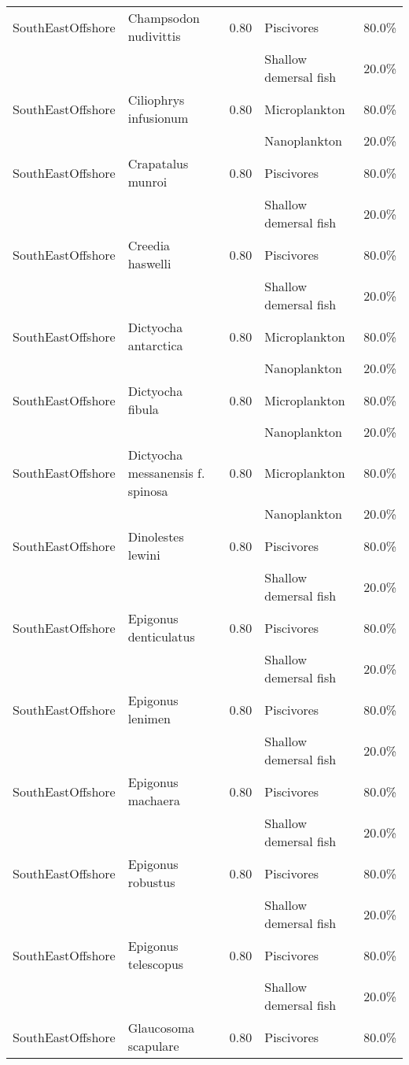 \begin{longtable}{llcll}
\hline
SouthEastOffshore & Champsodon nudivittis & 0.80 & Piscivores & 80.0\% \\
& & & Shallow demersal fish & 20.0\% \\
\hline
SouthEastOffshore & Ciliophrys infusionum & 0.80 & Microplankton & 80.0\% \\
& & & Nanoplankton & 20.0\% \\
\hline
SouthEastOffshore & Crapatalus munroi & 0.80 & Piscivores & 80.0\% \\
& & & Shallow demersal fish & 20.0\% \\
\hline
SouthEastOffshore & Creedia haswelli & 0.80 & Piscivores & 80.0\% \\
& & & Shallow demersal fish & 20.0\% \\
\hline
SouthEastOffshore & Dictyocha antarctica & 0.80 & Microplankton & 80.0\% \\
& & & Nanoplankton & 20.0\% \\
\hline
SouthEastOffshore & Dictyocha fibula & 0.80 & Microplankton & 80.0\% \\
& & & Nanoplankton & 20.0\% \\
\hline
SouthEastOffshore & Dictyocha messanensis f. spinosa & 0.80 & Microplankton & 80.0\% \\
& & & Nanoplankton & 20.0\% \\
\hline
SouthEastOffshore & Dinolestes lewini & 0.80 & Piscivores & 80.0\% \\
& & & Shallow demersal fish & 20.0\% \\
\hline
SouthEastOffshore & Epigonus denticulatus & 0.80 & Piscivores & 80.0\% \\
& & & Shallow demersal fish & 20.0\% \\
\hline
SouthEastOffshore & Epigonus lenimen & 0.80 & Piscivores & 80.0\% \\
& & & Shallow demersal fish & 20.0\% \\
\hline
SouthEastOffshore & Epigonus machaera & 0.80 & Piscivores & 80.0\% \\
& & & Shallow demersal fish & 20.0\% \\
\hline
SouthEastOffshore & Epigonus robustus & 0.80 & Piscivores & 80.0\% \\
& & & Shallow demersal fish & 20.0\% \\
\hline
SouthEastOffshore & Epigonus telescopus & 0.80 & Piscivores & 80.0\% \\
& & & Shallow demersal fish & 20.0\% \\
\hline
SouthEastOffshore & Glaucosoma scapulare & 0.80 & Piscivores & 80.0\% \\

\end{longtable}
